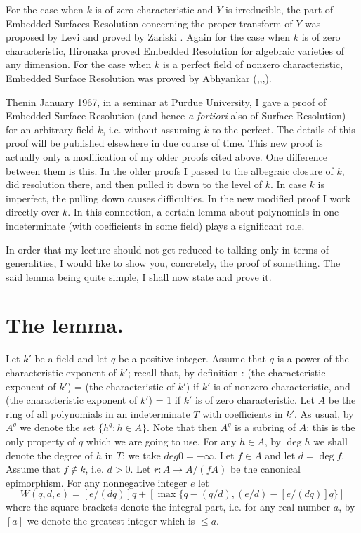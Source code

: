 For the case when $k$ is of zero characteristic and $Y$ is irreducible, the part of Embedded Surfaces Resolution concerning the proper transform of $Y$ was proposed by Levi \cite{art01-key13} and proved by Zariski \cite{art01-key18}. Again for the case when $k$ is of zero characteristic, Hironaka \cite{art01-key12} proved Embedded Resolution for algebraic varieties of any dimension. For the case when $k$ is a perfect field of nonzero characteristic, Embedded Surface Resolution was proved by Abhyankar (\cite{art01-key7},\cite{art01-key9},\cite{art01-key10},\cite{art01-key11}).

Then\pageoriginale in January 1967, in a seminar at Purdue University, I gave a proof of Embedded Surface Resolution (and hence {\em a fortiori} also of Surface Resolution) for an arbitrary field $k$, i.e. without assuming $k$ to the perfect. The details of this proof will be published elsewhere in due course of time. This new proof is actually only a modification of my older proofs cited above. One difference between them is this. In the older proofs I passed to the albegraic closure of $k$, did resolution there, and then pulled it down to the level of $k$. In case $k$ is imperfect, the pulling down causes difficulties. In the new modified proof I work directly over $k$. In this connection, a certain lemma about polynomials in one indeterminate (with coefficients in some field) plays a significant role.

In order that my lecture should not get reduced to talking only in terms of generalities, I would like to show you, concretely, the proof of something. The said lemma being quite simple, I shall now state and prove it.

\section{The lemma.}\label{art01-sec2}

Let $k'$ be a field and let $q$ be a positive integer. Assume that $q$ is a power of the characteristic exponent of $k'$; recall that, by definition : (the characteristic exponent of $k'$) = (the characteristic of $k'$) if $k'$ is of nonzero characteristic, and (the characteristic exponent of $k'$) = 1 if $k'$ is of zero characteristic. Let $A$ be the ring of all polynomials in an indeterminate $T$ with coefficients in $k'$. As usual, by $A^{q}$ we denote the set $\{h^{q}:h\in A\}$. Note that then $A^{q}$ is a subring of $A$; this is the only property of $q$ which we are going to use. For any $h\in A$, by $\deg h$ we shall denote the degree of $h$ in $T$; we take $deg 0 = -\infty$. Let $f\in A$ and let $d=\deg f$. Assume that $f\not\in k$, i.e. $d>0$. Let $r:A\to A/(fA)$ be the canonical epimorphism. For any nonnegative integer $e$ let
$$
W(q,d,e)=[e/(dq)]q+[\max \{q-(q/d),(e/d)-[e/(dq)]q\}]
$$
where the square brackets denote the integral part, i.e. for any real number $a$, by $[a]$ we denote the greatest integer which is $\leq a$.

